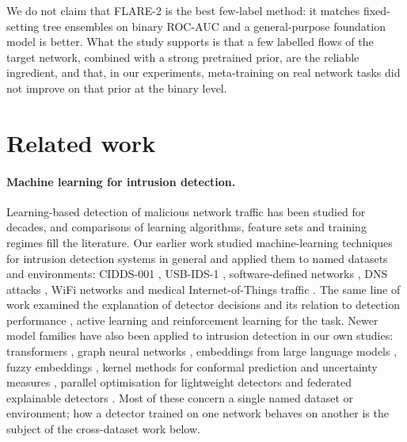 \documentclass[11pt]{article}
\begin{document}
We do not claim that FLARE-2 is the best few-label method: it matches fixed-setting tree ensembles on binary ROC-AUC and a general-purpose foundation model is better.
What the study supports is that a few labelled flows of the target network, combined with a strong pretrained prior, are the reliable ingredient, and that, in our experiments, meta-training on real network tasks did not improve on that prior at the binary level.

\section{Related work}
\paragraph{Machine learning for intrusion detection.}
Learning-based detection of malicious network traffic has been studied for decades, and comparisons of learning algorithms, feature sets and training regimes fill the literature.
Our earlier work studied machine-learning techniques for intrusion detection systems in general \citep{dang2019studying,dang2022cai,dang2022mlids} and applied them to named datasets and environments: CIDDS-001 \citep{dang2021cidds,dang2022cidds}, USB-IDS-1 \citep{dang2023usbmulti}, software-defined networks \citep{dang2021sdn,dang2024fuzzy}, DNS attacks \citep{dang2022dns,dang2021fuzzydns}, WiFi networks \citep{dang2023wifi} and medical Internet-of-Things traffic \citep{dang2024iomt}.
The same line of work examined the explanation of detector decisions and its relation to detection performance \citep{dang2020understand,dang2021explain}, active learning \citep{dang2020active} and reinforcement learning \citep{dang2022rl} for the task.
Newer model families have also been applied to intrusion detection in our own studies: transformers \citep{dang2023transformer}, graph neural networks \citep{dang2023wifi}, embeddings from large language models \citep{dang2025llm}, fuzzy embeddings \citep{dang2024fuzzy}, kernel methods for conformal prediction and uncertainty measures \citep{dang2024conformal,dang2026uncertainty}, parallel optimisation for lightweight detectors \citep{dang2024lightweight} and federated explainable detectors \citep{dang2026stfedxids}.
Most of these concern a single named dataset or environment; how a detector trained on one network behaves on another is the subject of the cross-dataset work below.
\end{document}
